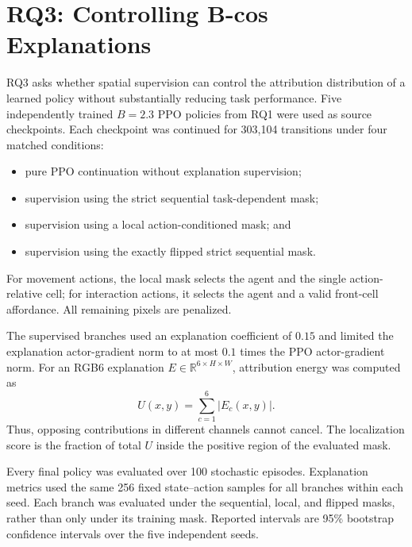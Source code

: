 \section{RQ3: Controlling B-cos Explanations}
\label{sec:rq3_results}

RQ3 asks whether spatial supervision can control the attribution distribution of a
learned policy without substantially reducing task performance. Five independently
trained $B=2.3$ PPO policies from RQ1 were used as source checkpoints. Each checkpoint
was continued for 303,104 transitions under four matched conditions:

\begin{itemize}
    \item pure PPO continuation without explanation supervision;
    \item supervision using the strict sequential task-dependent mask;
    \item supervision using a local action-conditioned mask; and
    \item supervision using the exactly flipped strict sequential mask.
\end{itemize}

For movement actions, the local mask selects the agent and the single
action-relative cell; for interaction actions, it selects the agent and a valid
front-cell affordance. All remaining pixels are penalized.

The supervised branches used an explanation coefficient of $0.15$ and limited the
explanation actor-gradient norm to at most $0.1$ times the PPO actor-gradient norm.
For an RGB6 explanation $E\in\mathbb{R}^{6\times H\times W}$, attribution energy was
computed as
\begin{equation}
    U(x,y)=\sum_{c=1}^{6}\lvert E_c(x,y)\rvert.
    \label{eq:rq3_channelwise_energy}
\end{equation}
Thus, opposing contributions in different channels cannot cancel. The localization
score is the fraction of total $U$ inside the positive region of the evaluated mask.

Every final policy was evaluated over 100 stochastic episodes. Explanation metrics
used the same 256 fixed state--action samples for all branches within each seed. Each
branch was evaluated under the sequential, local, and flipped masks, rather than only
under its training mask. Reported intervals are 95\% bootstrap confidence intervals
over the five independent seeds.

